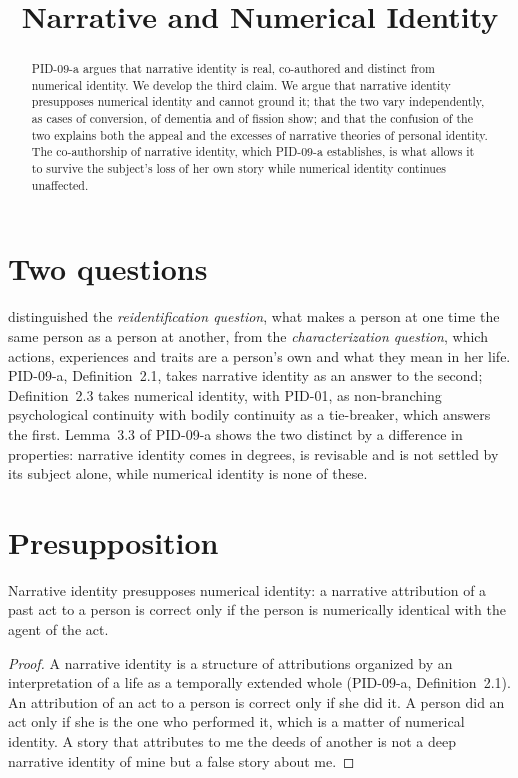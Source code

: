 \documentclass{situationist-preprint}
\title{Narrative and Numerical Identity}
\begin{document}
\maketitle

\begin{abstract}
PID-09-a argues that narrative identity is real, co-authored and distinct from numerical identity. We develop the third claim. We argue that narrative identity presupposes numerical identity and cannot ground it; that the two vary independently, as cases of conversion, of dementia and of fission show; and that the confusion of the two explains both the appeal and the excesses of narrative theories of personal identity. The co-authorship of narrative identity, which PID-09-a establishes, is what allows it to survive the subject's loss of her own story while numerical identity continues unaffected.
\end{abstract}

\section{Two questions}

\citet{Schechtman1996} distinguished the \emph{reidentification question}, what makes a person at one time the same person as a person at another, from the \emph{characterization question}, which actions, experiences and traits are a person's own and what they mean in her life. PID-09-a, Definition~2.1, takes narrative identity as an answer to the second; Definition~2.3 takes numerical identity, with PID-01, as non-branching psychological continuity with bodily continuity as a tie-breaker, which answers the first. Lemma~3.3 of PID-09-a shows the two distinct by a difference in properties: narrative identity comes in degrees, is revisable and is not settled by its subject alone, while numerical identity is none of these.

\section{Presupposition}

\begin{proposition}\label{p:presup}
Narrative identity presupposes numerical identity: a narrative attribution of a past act to a person is correct only if the person is numerically identical with the agent of the act.
\end{proposition}

\begin{proof}
A narrative identity is a structure of attributions organized by an interpretation of a life as a temporally extended whole (PID-09-a, Definition~2.1). An attribution of an act to a person is correct only if she did it. A person did an act only if she is the one who performed it, which is a matter of numerical identity. A story that attributes to me the deeds of another is not a deep narrative identity of mine but a false story about me.
\end{proof}
\end{document}
